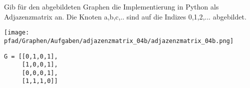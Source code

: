 ﻿\question[3]
Gib für den abgebildeten Graphen die Implementierung in Python als Adjazenzmatrix an.
Die Knoten a,b,c,.. sind auf die Indizes 0,1,2,... abgebildet.

\texttt{[image: \\pfad/Graphen/Aufgaben/adjazenzmatrix\_04b/adjazenzmatrix\_04b.png]}
\begin{solutionbox}{4cm}
\begin{lstlisting}
G = [[0,1,0,1],
     [1,0,0,1],
     [0,0,0,1],
     [1,1,1,0]]
\end{lstlisting}
\end{solutionbox}
